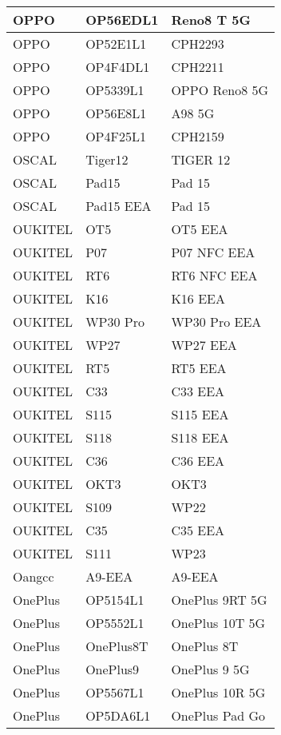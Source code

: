 \begin{tabularx}{\linewidth}{|l|X|X|}
        OPPO & OP56EDL1 & Reno8 T 5G \\ \hline
        OPPO & OP52E1L1 & CPH2293 \\ \hline
        OPPO & OP4F4DL1 & CPH2211 \\ \hline
        OPPO & OP5339L1 & OPPO Reno8 5G \\ \hline
        OPPO & OP56E8L1 & A98 5G \\ \hline
        OPPO & OP4F25L1 & CPH2159 \\ \hline
        OSCAL & Tiger12 & TIGER 12 \\ \hline
        OSCAL & Pad15 & Pad 15 \\ \hline
        OSCAL & Pad15 EEA & Pad 15 \\ \hline
        OUKITEL & OT5 & OT5 EEA \\ \hline
        OUKITEL & P07 & P07 NFC EEA \\ \hline
        OUKITEL & RT6 & RT6 NFC EEA \\ \hline
        OUKITEL & K16 & K16 EEA \\ \hline
        OUKITEL & WP30 Pro & WP30 Pro EEA \\ \hline
        OUKITEL & WP27 & WP27 EEA \\ \hline
        OUKITEL & RT5 & RT5 EEA \\ \hline
        OUKITEL & C33 & C33 EEA \\ \hline
        OUKITEL & S115 & S115 EEA \\ \hline
        OUKITEL & S118 & S118 EEA \\ \hline
        OUKITEL & C36 & C36 EEA \\ \hline
        OUKITEL & OKT3 & OKT3 \\ \hline
        OUKITEL & S109 & WP22 \\ \hline
        OUKITEL & C35 & C35 EEA \\ \hline
        OUKITEL & S111 & WP23 \\ \hline
        Oangcc & A9-EEA & A9-EEA \\ \hline
        OnePlus & OP5154L1 & OnePlus 9RT 5G \\ \hline
        OnePlus & OP5552L1 & OnePlus 10T 5G \\ \hline
        OnePlus & OnePlus8T & OnePlus 8T \\ \hline
        OnePlus & OnePlus9 & OnePlus 9 5G \\ \hline
        OnePlus & OP5567L1 & OnePlus 10R 5G \\ \hline
        OnePlus & OP5DA6L1 & OnePlus Pad Go \\ \hline

\end{tabularx}
